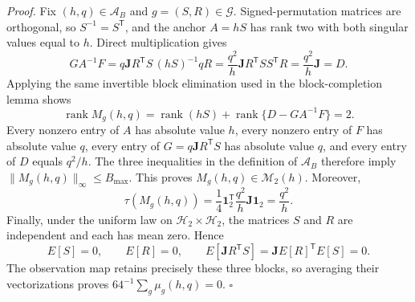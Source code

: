 \textit{Proof.}
Fix \((h,q)\in\mathcal A_B\) and \(g=(S,R)\in\mathcal G\).  Signed-permutation
matrices are orthogonal, so \(S^{-1}=S^{\mathsf T}\), and the anchor
\(A=hS\) has rank two with both singular values equal to \(h\).  Direct
multiplication gives
\[
GA^{-1}F
=q\mathbf J R^{\mathsf T}S\,(hS)^{-1}qR
=\frac{q^2}{h}\mathbf J R^{\mathsf T}SS^{\mathsf T}R
=\frac{q^2}{h}\mathbf J=D.
\]
Applying the same invertible block elimination used in the block-completion
lemma shows
\[
\operatorname{rank}M_g(h,q)
=\operatorname{rank}(hS)+
 \operatorname{rank}\{D-GA^{-1}F\}=2.
\]
Every nonzero entry of \(A\) has absolute value \(h\), every nonzero entry of
\(F\) has absolute value \(q\), every entry of
\(G=q\mathbf J R^{\mathsf T}S\) has absolute value \(q\), and every entry of
\(D\) equals \(q^2/h\).  The three inequalities in the definition of
\(\mathcal A_B\) therefore imply \(\lVert M_g(h,q)\rVert_\infty\leq B_{\max}\).
This proves \(M_g(h,q)\in\mathcal M_2(h)\).  Moreover,
\[
\tau(M_g(h,q))
=\frac14\mathbf 1_2^{\mathsf T}\frac{q^2}{h}\mathbf J\mathbf 1_2
=\frac{q^2}{h}.
\]
Finally, under the uniform law on
\(\mathcal H_2\times\mathcal H_2\), the matrices \(S\) and \(R\) are
independent and each has mean zero.  Hence
\[
E[S]=0,\qquad E[R]=0,\qquad
E[\mathbf J R^{\mathsf T}S]=\mathbf J E[R]^{\mathsf T}E[S]=0.
\]
The observation map retains precisely these three blocks, so averaging their
vectorizations proves \(64^{-1}\sum_g\mu_g(h,q)=0\). \(\square\)